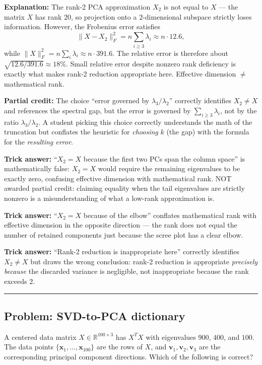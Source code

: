 \documentclass[12pt]{amsart}
\newcommand{\divider}{
  \vspace{-1em}
  \noindent
  \raisebox{-0.15ex}{\textbullet}%
  \hspace{0.5em}%
  \rule[0.5ex]{0.95\textwidth}{1.0pt}%
  \hspace{0.5em}%
  \raisebox{-0.15ex}{\textbullet}%
  \vspace{0em}
}
\begin{document}
\textbf{Explanation:}
The rank-2 PCA approximation $X_2$ is not equal to $X$ --- the matrix $X$ has
rank $20$, so projection onto a $2$-dimensional subspace strictly loses
information. However, the Frobenius error satisfies
$$\|X - X_2\|_F^2 = n \sum_{i \geq 3} \lambda_i \approx n \cdot 12.6,$$
while $\|X\|_F^2 = n \sum_i \lambda_i \approx n \cdot 391.6$. The relative
error is therefore about $\sqrt{12.6/391.6} \approx 18\%$. Small relative error
despite nonzero rank deficiency is exactly what makes rank-2 reduction
appropriate here. Effective dimension $\neq$ mathematical rank.

\textbf{Partial credit:}
The choice ``error governed by $\lambda_3/\lambda_2$'' correctly identifies
$X_2 \neq X$ and references the spectral gap, but the error is governed by
$\sum_{i \geq 3} \lambda_i$, not by the ratio $\lambda_3/\lambda_2$.
A student picking this choice correctly understands the math of the truncation
but conflates the heuristic for \emph{choosing} $k$ (the gap) with the formula
for the \emph{resulting error}.

\textbf{Trick answer:}
``$X_2 = X$ because the first two PCs span the column space'' is mathematically
false: $X_2 = X$ would require the remaining eigenvalues to be exactly zero,
confusing effective dimension with mathematical rank. NOT awarded partial
credit: claiming equality when the tail eigenvalues are strictly nonzero is
a misunderstanding of what a low-rank approximation is.

\textbf{Trick answer:}
``$X_2 = X$ because of the elbow'' conflates mathematical rank with effective
dimension in the opposite direction --- the rank does not equal the number
of retained components just because the scree plot has a clear elbow.

\textbf{Trick answer:}
``Rank-2 reduction is inappropriate here'' correctly identifies $X_2 \neq X$
but draws the wrong conclusion: rank-2 reduction is appropriate \emph{precisely
because} the discarded variance is negligible, not inappropriate because the
rank exceeds 2.

\divider

\subsection*{Problem: SVD-to-PCA dictionary}

A centered data matrix $X \in \mathbb{R}^{100 \times 3}$ has $X^TX$ with
eigenvalues $900$, $400$, and $100$. The data points
$\{\mathbf{x}_1, \ldots, \mathbf{x}_{100}\}$ are the rows of $X$, and
$\mathbf{v}_1, \mathbf{v}_2, \mathbf{v}_3$ are the corresponding principal
component directions. Which of the following is correct?
\end{document}
